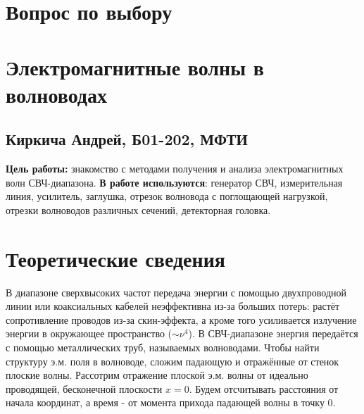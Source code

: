 



\section*{Вопрос по выбору}	
\section*{Электромагнитные волны в волноводах}
\subsection*{Киркича Андрей, Б01-202, МФТИ}
\n
\textbf{Цель работы:} знакомство с методами получения и анализа электромагнитных волн СВЧ-диапазона.
\n\n
\textbf{В работе используются}: генератор СВЧ, измерительная линия, усилитель, заглушка, отрезок волновода с поглощающей нагрузкой, отрезки волноводов различных сечений, детекторная головка.

\section*{Теоретические сведения}
В диапазоне сверхвысоких частот передача энергии с помощью двухпроводной линии или коаксиальных кабелей неэффективна из-за больших потерь: растёт сопротивление проводов из-за скин-эффекта, а кроме того усиливается излучение энергии в окружающее пространство ($\sim \nu^4$). В СВЧ-диапазоне энергия передаётся с помощью металлических труб, называемых волноводами.
\n\n
Чтобы найти структуру э.м. поля в волноводе, сложим падающую и отражённые от стенок плоские волны.
\n\n
Рассотрим отражение плоской э.м. волны от идеально проводящей, бесконечной плоскости $x = 0$. Будем отсчитывать расстояния от начала координат, а время - от момента прихода падающей волны в точку 0.

